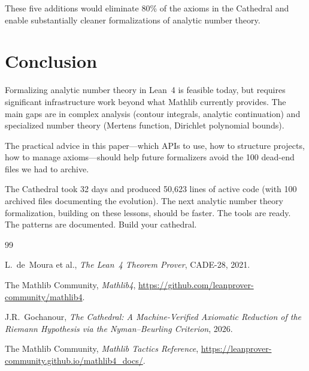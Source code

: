 \documentclass[11pt,a4paper]{article}
\begin{document}
These five additions would eliminate 80\% of the axioms in the
Cathedral and enable substantially cleaner formalizations of
analytic number theory.

\section{Conclusion}

Formalizing analytic number theory in Lean~4 is feasible today, but
requires significant infrastructure work beyond what Mathlib currently
provides. The main gaps are in complex analysis (contour integrals,
analytic continuation) and specialized number theory (Mertens function,
Dirichlet polynomial bounds).

The practical advice in this paper---which APIs to use, how to
structure projects, how to manage axioms---should help future
formalizers avoid the 100 dead-end files we had to archive.

The Cathedral took 32 days and produced 50{,}623 lines of active code
(with 100 archived files documenting the evolution).
The next analytic number theory formalization, building on these
lessons, should be faster. The tools are ready. The patterns are
documented. Build your cathedral.

\vspace{0.5cm}

\begin{thebibliography}{99}

L.~de~Moura et al., \emph{The Lean~4 Theorem Prover}, CADE-28, 2021.

The Mathlib Community, \emph{Mathlib4},
\url{https://github.com/leanprover-community/mathlib4}.

J.R.~Gochanour, \emph{The Cathedral: A Machine-Verified Axiomatic
Reduction of the Riemann Hypothesis via the Nyman--Beurling Criterion},
2026.

The Mathlib Community, \emph{Mathlib Tactics Reference},
\url{https://leanprover-community.github.io/mathlib4_docs/}.

\end{thebibliography}
\end{document}
